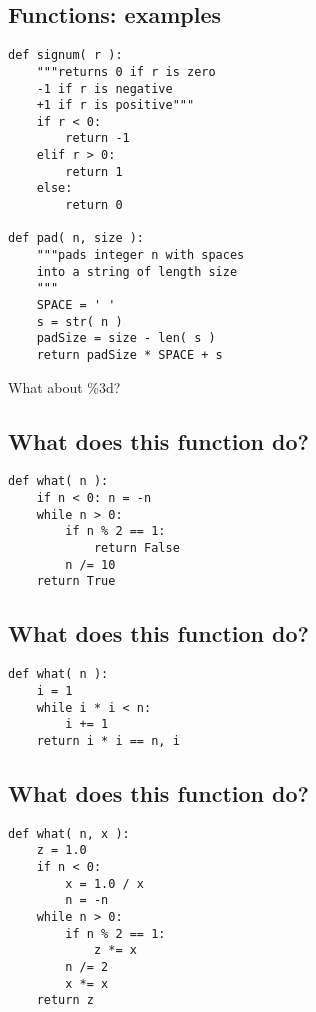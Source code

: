 \documentclass[12pt]{article}
\begin{document}
\subsection{Functions: examples}
  \begin{verbatim}
def signum( r ):
    """returns 0 if r is zero
    -1 if r is negative
    +1 if r is positive"""
    if r < 0:
        return -1
    elif r > 0:
        return 1
    else:
        return 0

def pad( n, size ): 
    """pads integer n with spaces
    into a string of length size
    """
    SPACE = ' '
    s = str( n )
    padSize = size - len( s )
    return padSize * SPACE + s
  \end{verbatim}
What about \%3d?

\subsection  {What does this function do?}
  \begin{verbatim}
def what( n ):
    if n < 0: n = -n
    while n > 0:
        if n % 2 == 1:
            return False
        n /= 10
    return True
  \end{verbatim}
\newpage

\subsection{What does this function do?}
\begin{verbatim}
def what( n ):
    i = 1    
    while i * i < n:
        i += 1
    return i * i == n, i
  \end{verbatim}

\subsection{What does this function do?}
  \begin{verbatim}
def what( n, x ):
    z = 1.0
    if n < 0:
        x = 1.0 / x
        n = -n
    while n > 0:
        if n % 2 == 1:
            z *= x
        n /= 2
        x *= x
    return z
  \end{verbatim}
\end{document}
